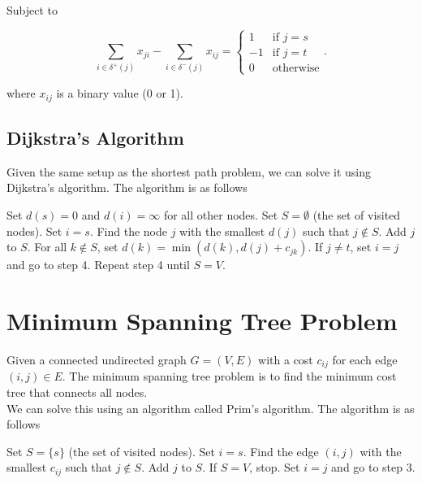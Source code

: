 \documentclass{report}
\begin{document}
Subject to

\[
	\sum_{i\in\delta^+(j)} x_{ji} - \sum_{i\in\delta^-(j)} x_{ij} = \begin{cases}
		1  & \text{if } j=s   \\
		-1 & \text{if } j=t   \\
		0  & \text{otherwise}
	\end{cases}
	.\]

where $x_{ij}$ is a binary value (0 or 1).

\subsection{Dijkstra's Algorithm}

Given the same setup as the shortest path problem, we can solve it using Dijkstra's algorithm. The algorithm is as follows

\begin{enumerate}
	\ii Set $d(s)=0$ and $d(i)=\infty$ for all other nodes.
	\ii Set $S=\emptyset$ (the set of visited nodes).
	\ii Set $i=s$.
	\ii Find the node $j$ with the smallest $d(j)$ such that $j\notin S$.
	\ii Add $j$ to $S$.
	\ii For all $k\notin S$, set $d(k)=\min(d(k),d(j)+c_{jk})$.
	\ii If $j\neq t$, set $i=j$ and go to step 4.
	\ii Repeat step 4 until $S=V$.
\end{enumerate}

\section{Minimum Spanning Tree Problem}

Given a connected undirected graph $G=(V,E)$ with a cost $c_{ij}$ for each edge $(i,j)\in E$. The minimum spanning tree problem is to find the minimum cost tree that connects all nodes.\\

We can solve this using an algorithm called Prim's algorithm. The algorithm is as follows

\begin{enumerate}
	\ii Set $S=\{s\}$ (the set of visited nodes).
	\ii Set $i=s$.
	\ii Find the edge $(i,j)$ with the smallest $c_{ij}$ such that $j\notin S$.
	\ii Add $j$ to $S$.
	\ii If $S=V$, stop.
	\ii Set $i=j$ and go to step 3.
\end{enumerate}
\end{document}
